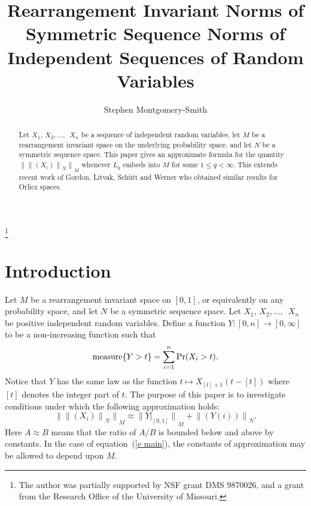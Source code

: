 \documentclass[12pt]{amsart}
\newcommand{\snormo}[1]{{\mathopen\|#1\mathclose\|}}
\newcommand{\measure}{\text{\rm measure}}
\begin{document}
\title[R.i. norms of symmetric sequence norms]
{Rearrangement Invariant Norms of Symmetric Sequence Norms
of Independent Sequences of Random Variables
}

\author{Stephen Montgomery-Smith}
\makeatletter
\address{Department of Mathematics\\
University of Missouri\\
Columbia, MO 65211}
\thanks{The author was 
partially supported
by NSF grant DMS 9870026, and a grant from the Research Office of the
University of Missouri.}

\begin{abstract}
\noindent
Let $X_1$, $X_2,\dots,$\ $X_n$ be a sequence of independent random
variables, let $M$ be a rearrangement invariant space on the underlying
probability space, and let $N$ be a symmetric sequence space.  This paper
gives an approximate formula for the quantity
$\snormo{\snormo{(X_i)}_N}_M$ whenever $L_q$ embeds into $M$ for some
$1 \le q < \infty$.
This extends recent work of Gordon, Litvak, Sch\"utt and Werner who obtained
similar results for Orlicz spaces.
\end{abstract}

\maketitle

\section{Introduction}

Let $M$ be a rearrangement invariant space on $[0,1]$, or equivalently
on any probability space, and let $N$ be a symmetric sequence space.
Let $X_1$, $X_2, \dots,$\ $X_n$ be positive independent random variables.
Define a function $Y:[0,n] \to [0,\infty]$ to be a non-increasing
function such that
\[ \measure\{Y > t \} = \sum_{i=1}^n \Pr(X_i > t) . \]
Notice that $Y$ has the same law as the function 
$t \mapsto X_{[t]+1}(t-[t])$ where $[t]$ denotes the integer part of $t$.
The purpose of this paper is to investigate conditions under which
the following approximation holds:
\begin{equation}
\label{e main}
   \snormo{\snormo{(X_i)}_N}_M \approx
   \snormo{Y|_{[0,1]}}_M + \snormo{(Y(i))}_N .
\end{equation}
Here $A \approx B$ means that the ratio of $A/B$ is bounded below
and above by constants.  In the case of equation~(\ref{e main}), the
constants of approximation may be allowed to depend upon $M$.
\end{document}
